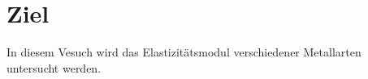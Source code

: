 \section{Ziel}
\label{sec:Ziel}

In diesem Vesuch wird das Elastizitätsmodul verschiedener
Metallarten untersucht werden.